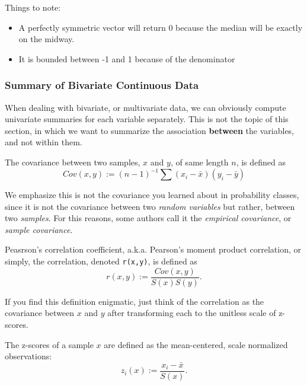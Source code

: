 \documentclass[]{book}
\providecommand{\tightlist}{%
  \setlength{\itemsep}{0pt}\setlength{\parskip}{0pt}}
\theoremstyle{definition}
\theoremstyle{definition}
\theoremstyle{definition}
\theoremstyle{remark}
\let\BeginKnitrBlock\begin \let\EndKnitrBlock\end
\begin{document}
Things to note:

\begin{itemize}
\tightlist
\item
  A perfectly symmetric vector will return 0 because the median will be exactly on the midway.
\item
  It is bounded between -1 and 1 because of the denominator
\end{itemize}

\hypertarget{summary-of-bivariate-continuous-data}{%
\subsubsection{Summary of Bivariate Continuous Data}\label{summary-of-bivariate-continuous-data}}

When dealing with bivariate, or multivariate data, we can obviously compute univariate summaries for each variable separately.
This is not the topic of this section, in which we want to summarize the association \textbf{between} the variables, and not within them.

\BeginKnitrBlock{definition}[Covariance]
\protect\hypertarget{def:unnamed-chunk-123}{}{\label{def:unnamed-chunk-123} {} }The covariance between two samples, \(x\) and \(y\), of same length \(n\), is defined as
\[Cov(x,y):= (n-1)^{-1} \sum (x_i-\bar x)(y_i-\bar y)  \]
\EndKnitrBlock{definition}

We emphasize this is not the covariance you learned about in probability classes, since it is not the covariance between two \emph{random variables} but rather, between two \emph{samples}.
For this reasons, some authors call it the \emph{empirical covariance}, or \emph{sample covariance}.

\BeginKnitrBlock{definition}[Pearson's Correlation Coefficient]
\protect\hypertarget{def:unnamed-chunk-124}{}{\label{def:unnamed-chunk-124} {} }Peasrson's correlation coefficient, a.k.a. Pearson's moment product correlation, or simply, the correlation, denoted \texttt{r(x,y)}, is defined as
\[r(x,y):=\frac{Cov(x,y)}{S(x)S(y)}. \]
\EndKnitrBlock{definition}

If you find this definition enigmatic, just think of the correlation as the covariance between \(x\) and \(y\) after transforming each to the unitless scale of z-scores.

\BeginKnitrBlock{definition}[Z-Score]
\protect\hypertarget{def:unnamed-chunk-125}{}{\label{def:unnamed-chunk-125} {} }The z-scores of a sample \(x\) are defined as the mean-centered, scale normalized observations:
\[z_i(x):= \frac{x_i-\bar x}{S(x)}.\]
\EndKnitrBlock{definition}
\end{document}
